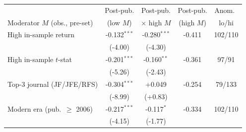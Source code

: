 \begin{tabular}{lcccc}
\toprule
 & Post-pub. & Post-pub. & Post-pub. & Anom.\ \\
Moderator $M$ (obs., pre-set) & (low $M$) & $\times$ high $M$ & (high $M$) & lo/hi \\
\midrule
High in-sample return & -0.132$^{***}$ & -0.280$^{***}$ & -0.411 & 102/110 \\
 & (-4.00) & (-4.30) & & \\
High in-sample $t$-stat & -0.201$^{***}$ & -0.160$^{**}$ & -0.361 & 97/91 \\
 & (-5.26) & (-2.43) & & \\
Top-3 journal (JF/JFE/RFS) & -0.304$^{***}$ & +0.049 & -0.254 & 79/133 \\
 & (-8.99) & (+0.83) & & \\
Modern era (pub.\ $\ge$ 2006) & -0.217$^{***}$ & -0.117$^{*}$ & -0.334 & 102/110 \\
 & (-4.15) & (-1.77) & & \\
\bottomrule
\end{tabular}